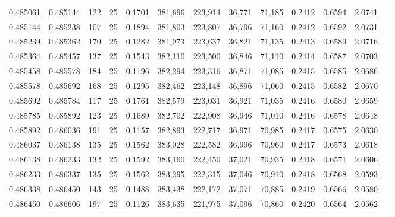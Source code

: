 \begin{tabular}{rrrrrrrrrrrrr}
0.485061 & 0.485144 &   122 &  25 &                                     0.1701 & 381,696 & 223,914 &  36,771 &  71,185 & 0.2412 & 0.6594 & 2.0741 \\
0.485144 & 0.485238 &   107 &  25 &                                     0.1894 & 381,803 & 223,807 &  36,796 &  71,160 & 0.2412 & 0.6592 & 2.0731 \\
0.485239 & 0.485362 &   170 &  25 &                                     0.1282 & 381,973 & 223,637 &  36,821 &  71,135 & 0.2413 & 0.6589 & 2.0716 \\
0.485364 & 0.485457 &   137 &  25 &                                     0.1543 & 382,110 & 223,500 &  36,846 &  71,110 & 0.2414 & 0.6587 & 2.0703 \\
0.485458 & 0.485578 &   184 &  25 &                                     0.1196 & 382,294 & 223,316 &  36,871 &  71,085 & 0.2415 & 0.6585 & 2.0686 \\
0.485578 & 0.485692 &   168 &  25 &                                     0.1295 & 382,462 & 223,148 &  36,896 &  71,060 & 0.2415 & 0.6582 & 2.0670 \\
0.485692 & 0.485784 &   117 &  25 &                                     0.1761 & 382,579 & 223,031 &  36,921 &  71,035 & 0.2416 & 0.6580 & 2.0659 \\
0.485785 & 0.485892 &   123 &  25 &                                     0.1689 & 382,702 & 222,908 &  36,946 &  71,010 & 0.2416 & 0.6578 & 2.0648 \\
0.485892 & 0.486036 &   191 &  25 &                                     0.1157 & 382,893 & 222,717 &  36,971 &  70,985 & 0.2417 & 0.6575 & 2.0630 \\
0.486037 & 0.486138 &   135 &  25 &                                     0.1562 & 383,028 & 222,582 &  36,996 &  70,960 & 0.2417 & 0.6573 & 2.0618 \\
0.486138 & 0.486233 &   132 &  25 &                                     0.1592 & 383,160 & 222,450 &  37,021 &  70,935 & 0.2418 & 0.6571 & 2.0606 \\
0.486233 & 0.486337 &   135 &  25 &                                     0.1562 & 383,295 & 222,315 &  37,046 &  70,910 & 0.2418 & 0.6568 & 2.0593 \\
0.486338 & 0.486450 &   143 &  25 &                                     0.1488 & 383,438 & 222,172 &  37,071 &  70,885 & 0.2419 & 0.6566 & 2.0580 \\
0.486450 & 0.486606 &   197 &  25 &                                     0.1126 & 383,635 & 221,975 &  37,096 &  70,860 & 0.2420 & 0.6564 & 2.0562 \\

\end{tabular}
